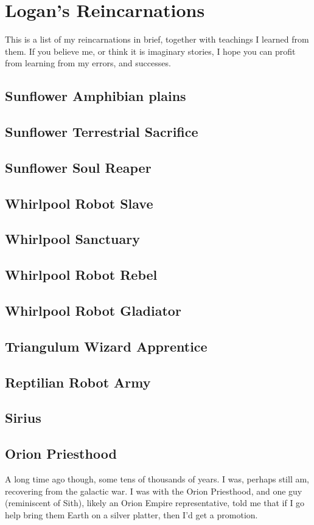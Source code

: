 \part{Logan's Reincarnations}
\label{reincarnation}

This is a list of my reincarnations in brief, together with teachings I learned
from them. 
If you believe me, or think it is imaginary stories, 
I hope you can profit from learning from my errors, and successes.

\chapter{Sunflower Amphibian plains}
\chapter{Sunflower Terrestrial Sacrifice}
\chapter{Sunflower Soul Reaper}
\chapter{Whirlpool Robot Slave}
\chapter{Whirlpool Sanctuary}
\chapter{Whirlpool Robot Rebel}
\chapter{Whirlpool Robot Gladiator}
\chapter{Triangulum Wizard Apprentice}
\chapter{Reptilian Robot Army}
\chapter{Sirius}
\chapter{Orion Priesthood}
A long time ago though, some tens of thousands of years. I was, perhaps still am, recovering from the galactic war. I was with the Orion Priesthood, and one guy (reminiscent of Sith), likely an Orion Empire representative, told me that if I go help bring them Earth on a silver platter, then I'd get a promotion.


